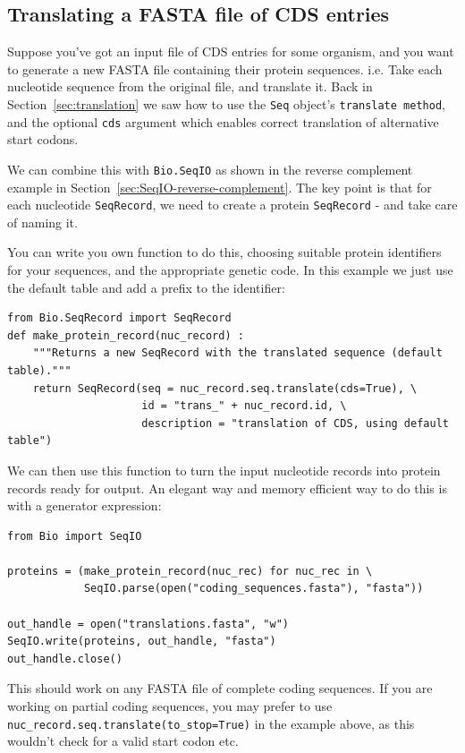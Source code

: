 \documentclass{report}
\begin{document}
\subsection{Translating a FASTA file of CDS entries}
\label{sec:SeqIO-translate}
Suppose you've got an input file of CDS entries for some organism, and you
want to generate a new FASTA file containing their protein sequences.  i.e.
Take each nucleotide sequence from the original file, and translate it.
Back in Section~\ref{sec:translation} we saw how to use the \verb|Seq|
object's \verb|translate method|, and the optional \verb|cds| argument
which enables correct translation of alternative start codons.

We can combine this with \verb|Bio.SeqIO| as
shown in the reverse complement example in Section~\ref{sec:SeqIO-reverse-complement}.
The key point is that for each nucleotide \verb|SeqRecord|, we need to create
a protein \verb|SeqRecord| - and take care of naming it.

You can write you own function to do this, choosing suitable protein identifiers
for your sequences, and the appropriate genetic code.  In this example we just
use the default table and add a prefix to the identifier:

\begin{verbatim}
from Bio.SeqRecord import SeqRecord
def make_protein_record(nuc_record) :
    """Returns a new SeqRecord with the translated sequence (default table)."""
    return SeqRecord(seq = nuc_record.seq.translate(cds=True), \
                     id = "trans_" + nuc_record.id, \
                     description = "translation of CDS, using default table")
\end{verbatim}

We can then use this function to turn the input nucleotide records into protein
records ready for output.  An elegant way and memory efficient way to do this
is with a generator expression:

\begin{verbatim}
from Bio import SeqIO

proteins = (make_protein_record(nuc_rec) for nuc_rec in \
            SeqIO.parse(open("coding_sequences.fasta"), "fasta"))

out_handle = open("translations.fasta", "w")
SeqIO.write(proteins, out_handle, "fasta")
out_handle.close()
\end{verbatim}

This should work on any FASTA file of complete coding sequences.
If you are working on partial coding sequences, you may prefer to use
\verb|nuc_record.seq.translate(to_stop=True)| in the example above, as
this wouldn't check for a valid start codon etc.
\end{document}
